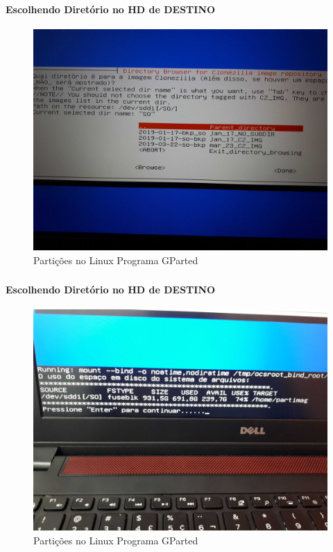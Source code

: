 \documentclass{beamer}
\begin{document}
\begin{frame}[plain,c]
   \frametitle{\insertsection}
    \framesubtitle{Escolhendo Diretório no HD de DESTINO}
    \begin{figure}[!h]
        \includegraphics[width=1\linewidth]{images/backup/bkp11.jpg}
        \caption{Partições no Linux Programa GParted}
    \end{figure}
\end{frame}

\begin{frame}[plain,c]
   \frametitle{\insertsection}
    \framesubtitle{Escolhendo Diretório no HD de DESTINO}
    \begin{figure}[!h]
        \includegraphics[width=1\linewidth]{images/backup/bkp12.jpg}
        \caption{Partições no Linux Programa GParted}
    \end{figure}
\end{frame}
\end{document}
